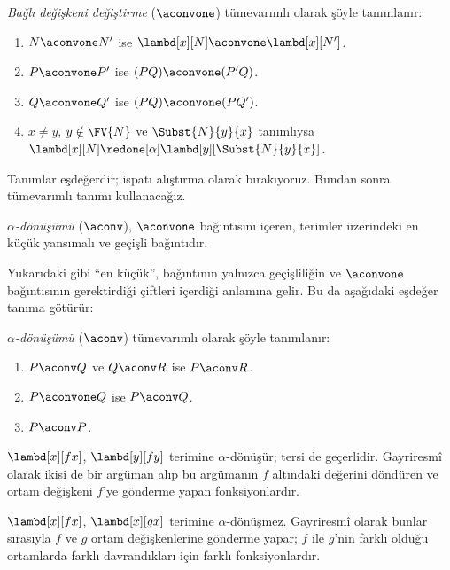 \begin{defn} 
  \emph{Bağlı değişkeni değiştirme} ($\aconvone$) tümevarımlı olarak şöyle
  tanımlanır:
  \begin{enumerate}
  \item $N \aconvone N'$ ise $\lambd[x][N] \aconvone
    \lambd[x][N']$. 
  \item $P \aconvone P'$ ise $(PQ) \aconvone (P'Q)$.
  \item $Q \aconvone Q'$ ise $(PQ) \aconvone (PQ')$.
  \item $x \neq y$, $y \notin \FV{N}$ ve $\Subst{N}{y}{x}$ tanımlıysa
    $\lambd[x][N] \redone[\alpha] \lambd[y][\Subst{N}{y}{x}]$.
  \end{enumerate}
\end{defn}

Tanımlar eşdeğerdir; ispatı alıştırma olarak bırakıyoruz. Bundan sonra
tümevarımlı tanımı kullanacağız.

\begin{defn}
  \emph{$\alpha$-dönüşümü} ($\aconv$), $\aconvone$ bağıntısını içeren,
  terimler üzerindeki en küçük yansımalı ve geçişli bağıntıdır.
\end{defn}

Yukarıdaki gibi ``en küçük'', bağıntının yalnızca geçişliliğin ve
$\aconvone$ bağıntısının gerektirdiği çiftleri içerdiği anlamına gelir. Bu da
aşağıdaki eşdeğer tanıma götürür:

\begin{defn} 
  \emph{$\alpha$-dönüşümü} ($\aconv$) tümevarımlı olarak şöyle tanımlanır:
  \begin{enumerate}
  \item $P \aconv Q$ ve $Q \aconv R$ ise $P \aconv R$.
  \item $P \aconvone Q$ ise $P \aconv Q$. 
  \item $P \aconv P$. 
  \end{enumerate}
\end{defn}

\begin{ex}
  $\lambd[x][f x]$, $\lambd[y][f y]$ terimine $\alpha$-dönüşür; tersi de
  geçerlidir. Gayriresmî olarak ikisi de bir argüman alıp bu argümanın $f$
  altındaki değerini döndüren ve ortam değişkeni $f$'ye gönderme yapan
  fonksiyonlardır.

  $\lambd[x][f x]$, $\lambd[x][g x]$ terimine $\alpha$-dönüşmez.
  Gayriresmî olarak bunlar sırasıyla $f$ ve $g$ ortam değişkenlerine gönderme
  yapar; $f$ ile $g$'nin farklı olduğu ortamlarda farklı davrandıkları için
  farklı fonksiyonlardır.
\end{ex}

